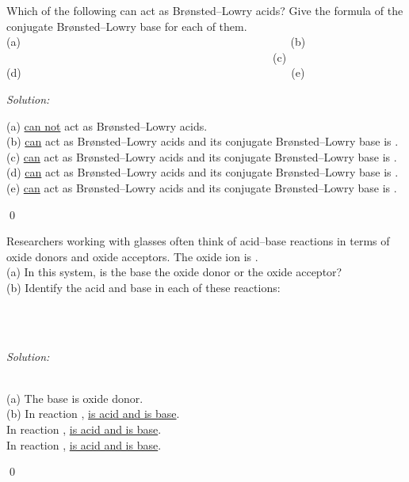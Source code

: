 \documentclass[12pt]{article}
\newenvironment{problem}[2][Problem]{\begin{trivlist}
\item[\hskip \labelsep {\bfseries #1}\hskip \labelsep {\bfseries #2.}]}{\end{trivlist}}
\newenvironment{sol}
    {\emph{Solution:}
    }
    {
    \qed
    }
\begin{document}
\begin{problem}{15.1}
Which of the following can act as Brønsted–Lowry acids? Give the formula of the conjugate Brønsted–Lowry base for each of them.\\
(a) ~~~~~~~~~~~~~~~~~~~~~~~~~~~~~~~~~~~~~~~~~~~~~~~~(b) ~~~~~~~~~~~~~~~~~~~~~~~~~~~~~~~~~~~~~~~~~~~~~~~~(c) \\
(d) ~~~~~~~~~~~~~~~~~~~~~~~~~~~~~~~~~~~~~~~~~~~~~~~~(e) 
\end{problem}
\begin{sol}
(a)  \uline{can not} act as Brønsted–Lowry acids.\\
(b)  \uline{can} act as Brønsted–Lowry acids and its conjugate Brønsted–Lowry base is \underline{}.\\
(c)  \uline{can} act as Brønsted–Lowry acids and its conjugate Brønsted–Lowry base is \underline{}.\\
(d)  \uline{can} act as Brønsted–Lowry acids and its conjugate Brønsted–Lowry base is \underline{}.\\
(e)  \uline{can} act as Brønsted–Lowry acids and its conjugate Brønsted–Lowry base is \underline{}.
\end{sol}

\begin{problem}{15.1}
Researchers working with glasses often think of acid–base reactions in terms of oxide donors and oxide acceptors. The oxide ion is .\\
(a) In this system, is the base the oxide donor or the oxide
acceptor?\\
(b) Identify the acid and base in each of these reactions:\\
\begin{center}
\\
\\
\end{center}
\end{problem}
\begin{sol}
\\(a) The base is oxide donor.\\
(b) In reaction , \underline{ is acid and  is base}.\\
In reaction , \underline{ is acid and  is base}.\\
In reaction , \underline{ is acid and  is base}.
\end{sol}
\end{document}
